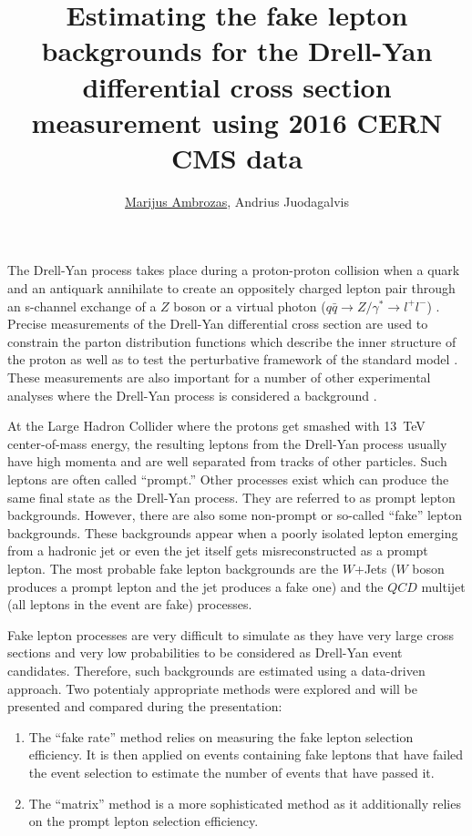\documentclass[a4paper,10pt,english]{article}
\begin{document}
\renewcommand{\figurename}{Fig.} 


\title{Estimating the fake lepton backgrounds for the Drell-Yan differential cross section measurement using 2016 CERN CMS data}


\author{\uline{Marijus Ambrozas}, Andrius Juodagalvis}

\maketitle

\address{Institute of Theoretical Physics and Astronomy, Faculty of Physics, Vilnius University, Lithuania}


The Drell-Yan process takes place during a proton-proton collision when a quark and an antiquark annihilate to create an
oppositely charged lepton pair through an s-channel exchange of a $Z$ boson or a virtual photon
($q\bar{q}\rightarrow Z/\gamma^*\rightarrow l^+l^-$) \cite{DY}.
Precise measurements of the Drell-Yan differential cross section are used to constrain the parton distribution functions
which describe the inner structure of the proton as well as to test the perturbative framework of the standard model \cite{DY13}.
These measurements are also important for a number of other experimental analyses where the Drell-Yan process is considered a
background \cite{Higgs, Zprime, SUSY}.

At the Large Hadron Collider where the protons get smashed with 13~TeV center-of-mass energy, the resulting leptons from the Drell-Yan
process usually have high momenta and are well separated from tracks of other particles.
Such leptons are often called ``prompt.''
Other processes exist which can produce the same final state as the Drell-Yan process.
They are referred to as prompt lepton backgrounds.
However, there are also some non-prompt or so-called ``fake'' lepton backgrounds.
These backgrounds appear when a poorly isolated lepton emerging from a hadronic jet or even the jet itself
gets misreconstructed as a prompt lepton.
The most probable fake lepton backgrounds are the $W$+Jets ($W$ boson produces a prompt lepton and the jet produces a fake one)
and the $QC\!D$ multijet (all leptons in the event are fake) processes.

Fake lepton processes are very difficult to simulate as they have very large cross sections and very low probabilities to be
considered as Drell-Yan event candidates.
Therefore, such backgrounds are estimated using a data-driven approach.
Two potentialy appropriate methods were explored and will be presented and compared during the presentation:
\begin{enumerate}
\item The ``fake rate'' method relies on measuring the fake lepton selection efficiency. It is then
applied on events containing fake leptons that have failed the event selection to estimate the number of
events that have passed it.
\item The ``matrix'' method is a more sophisticated method as it additionally relies on
the prompt lepton selection efficiency.
\end{enumerate}
\end{document}
